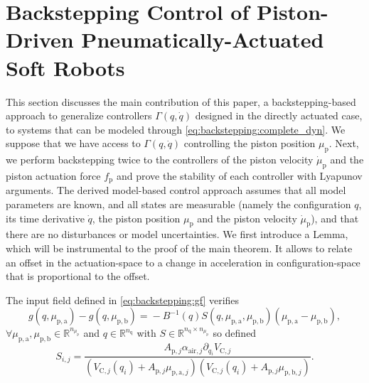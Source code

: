 \section{Backstepping Control of Piston-Driven Pneumatically-Actuated Soft Robots}\label{sec:backstepping:backstepping_proof}

This section discusses the main contribution of this paper, a backstepping-based approach to generalize controllers $\Gamma(q,\dot{q})$ designed in the directly actuated case, to systems that can be modeled through \eqref{eq:backstepping:complete_dyn}.
We suppose that we have access to $\Gamma(q, \dot{q})$ controlling the piston position $\mu_\mathrm{p}$. Next, we perform backstepping twice to the controllers of the piston velocity $\dot{\mu}_\mathrm{p}$ and the piston actuation force $f_\mathrm{p}$ and prove the stability of each controller with Lyapunov arguments.
The derived model-based control approach assumes that all model parameters are known, and all states are measurable (namely the configuration $q$, its time derivative $\dot{q}$, the piston position $\mu_\mathrm{p}$ and the piston velocity $\dot{\mu}_\mathrm{p}$), and that there are no disturbances or model uncertainties. 
We first introduce a Lemma, which will be instrumental to the proof of the main theorem. It allows to relate an offset in the actuation-space to a change in acceleration in configuration-space that is proportional to the offset.
%
\begin{lemma}\label{lemma:f_g_S}%
The input field defined in \eqref{eq:backstepping:gf} verifies
%
\begin{equation*}
    g(q,\mu_{\mathrm{p},\mathrm{a}}) - g(q,\mu_{\mathrm{p},\mathrm{b}}) \!=\!  -B^{-1}\!(q)S(q,\mu_{\mathrm{p},\mathrm{a}},\mu_{\mathrm{p},\mathrm{b}})(\mu_{\mathrm{p},\mathrm{a}} \!- \mu_{\mathrm{p},\mathrm{b}}),    
\end{equation*}
%
$\forall \mu_{\mathrm{p},\mathrm{a}},\mu_{\mathrm{p},\mathrm{b}} \in \mathbb{R}^{n_{\mu_\mathrm{p}}}$ and $q \in \mathbb{R}^{n_{\mathrm{q}}}$
	with $S \in \mathbb{R}^{n_{\mathrm{q}} \times n_{\mu_\mathrm{p}}} $ so defined
	\begin{equation*}
	    S_{i,j} = \frac{ A_{\mathrm{p},j} \alpha_{\mathrm{air},j} \partial_{q_i}V_{\mathrm{C},j}}{(V_{\mathrm{C},j}(q_i) + A_{\mathrm{p},j} \mu_{\mathrm{p},\mathrm{a},j})(V_{\mathrm{C},j}(q_i) + A_{\mathrm{p},j} \mu_{\mathrm{p},\mathrm{b},j})}.
	\end{equation*}
\end{lemma}
